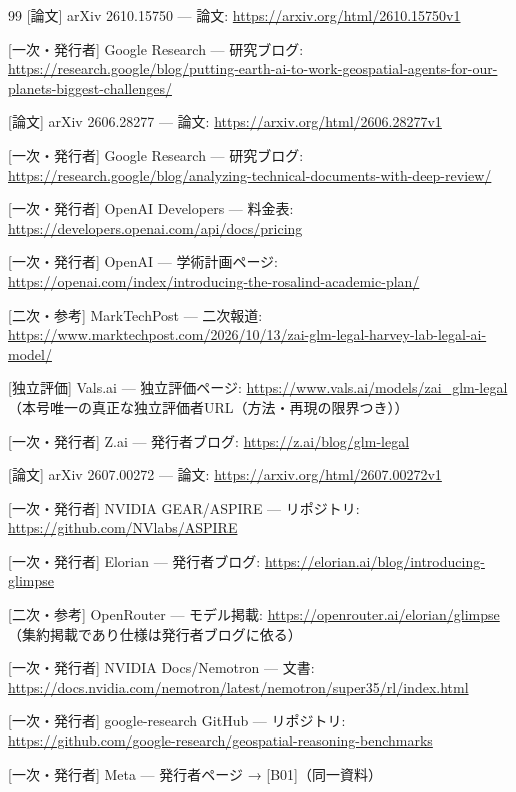 \documentclass[lualatex,a4paper,10pt]{jlreq}
\begin{document}
\begin{thebibliography}{99}
 [論文] arXiv 2610.15750 — 論文: \url{https://arxiv.org/html/2610.15750v1}

 [一次・発行者] Google Research — 研究ブログ: \url{https://research.google/blog/putting-earth-ai-to-work-geospatial-agents-for-our-planets-biggest-challenges/}

 [論文] arXiv 2606.28277 — 論文: \url{https://arxiv.org/html/2606.28277v1}

 [一次・発行者] Google Research — 研究ブログ: \url{https://research.google/blog/analyzing-technical-documents-with-deep-review/}

 [一次・発行者] OpenAI Developers — 料金表: \url{https://developers.openai.com/api/docs/pricing}

 [一次・発行者] OpenAI — 学術計画ページ: \url{https://openai.com/index/introducing-the-rosalind-academic-plan/}

 [二次・参考] MarkTechPost — 二次報道: \url{https://www.marktechpost.com/2026/10/13/zai-glm-legal-harvey-lab-legal-ai-model/}

 [独立評価] Vals.ai — 独立評価ページ: \url{https://www.vals.ai/models/zai_glm-legal}（本号唯一の真正な独立評価者URL（方法・再現の限界つき））

 [一次・発行者] Z.ai — 発行者ブログ: \url{https://z.ai/blog/glm-legal}

 [論文] arXiv 2607.00272 — 論文: \url{https://arxiv.org/html/2607.00272v1}

 [一次・発行者] NVIDIA GEAR/ASPIRE — リポジトリ: \url{https://github.com/NVlabs/ASPIRE}

 [一次・発行者] Elorian — 発行者ブログ: \url{https://elorian.ai/blog/introducing-glimpse}

 [二次・参考] OpenRouter — モデル掲載: \url{https://openrouter.ai/elorian/glimpse}（集約掲載であり仕様は発行者ブログに依る）

 [一次・発行者] NVIDIA Docs/Nemotron — 文書: \url{https://docs.nvidia.com/nemotron/latest/nemotron/super35/rl/index.html}

 [一次・発行者] google-research GitHub — リポジトリ: \url{https://github.com/google-research/geospatial-reasoning-benchmarks}

 [一次・発行者] Meta — 発行者ページ → [B01]（同一資料）


\end{thebibliography}
\end{document}
